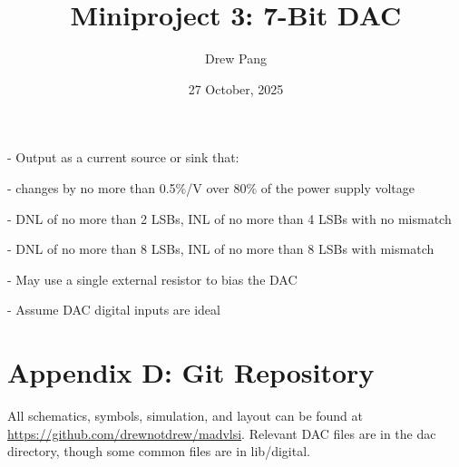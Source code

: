 \documentclass[11pt]{article}
\title{Miniproject 3: 7-Bit DAC}
\author{Drew Pang}
\date{27 October, 2025}
\begin{document}
\maketitle

\item[-] Output as a current source or sink that:
\item[-] changes by no more than 0.5\%/V over 80\% of the power supply voltage
\item[-] DNL of no more than 2 LSBs, INL of no more than 4 LSBs with no mismatch
\item[-] DNL of no more than 8 LSBs, INL of no more than 8 LSBs with mismatch
\item[-] May use a single external resistor to bias the DAC
\item[-] Assume DAC digital inputs are ideal




%   
%   

\newpage

\section*{Appendix D: Git Repository}

All schematics, symbols, simulation, and layout can be found at \href{https://github.com/drewnotdrew/madvlsi}{https://github.com/drewnotdrew/madvlsi}. Relevant DAC files are in the dac directory, though some common files are in lib/digital.
\end{document}
